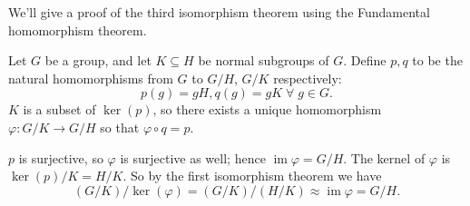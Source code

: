 \documentclass[12pt]{article}
\begin{document}
We'll give a proof of  the third isomorphism theorem using the Fundamental homomorphism theorem.

Let $G$ be a group, and let $K\subseteq H$ be normal subgroups of $G$. Define $p,q$ to be the natural homomorphisms from $G$ to $G/H$, $G/K$ respectively:
\[p(g)=gH, q(g)=gK\;\forall\;g \in G.\]
$K$ is a subset of $\ker(p)$, so there exists a unique homomorphism $\varphi\colon G/K \to G/H$ so that $\varphi \circ q=p$.

$p$ is surjective, so $\varphi$ is surjective as well; hence $\operatorname{im}\varphi=G/H$. The kernel of $\varphi$ is $\ker(p)/K=H/K$. So by the first isomorphism theorem we have
\[(G/K) / \ker(\varphi)=(G/K) / (H/K) \approx \operatorname{im}\varphi=G/H.\]
\end{document}
